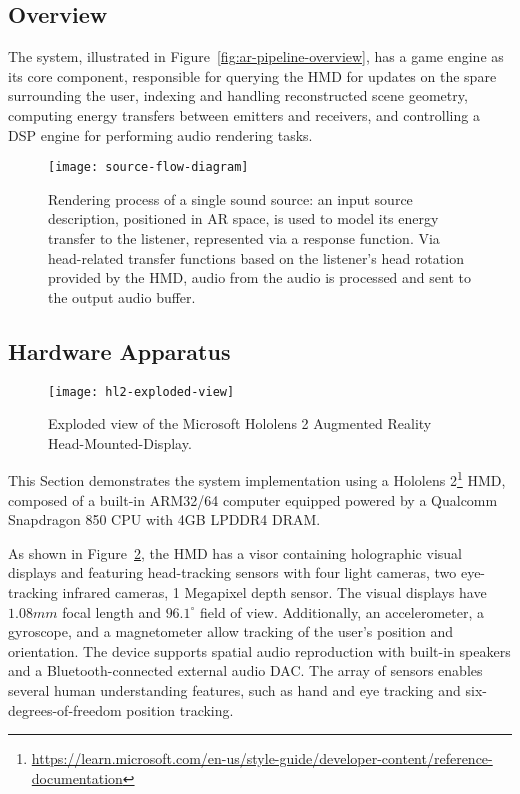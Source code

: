 \subsection{Overview}
The system, illustrated in Figure~\ref{fig:ar-pipeline-overview}, has a game engine as its core component, responsible for querying the HMD for updates on the spare surrounding the user, indexing and handling reconstructed scene geometry, computing energy transfers between emitters and receivers, and controlling a DSP engine for performing audio rendering tasks.
\begin{figure}[htb]
    \centering
    \texttt{[image: source-flow-diagram]}
    \caption{Rendering process of a single sound source: an input source description, positioned in AR space, is used to model its energy transfer to the listener, represented via a response function. Via head-related transfer functions based on the listener's head rotation provided by the HMD, audio from the audio is processed and sent to the output audio buffer.}
\label{fig:source-flow-diagram}
\end{figure}

\subsection{Hardware Apparatus}
\begin{figure}[h]
    \centering
    \texttt{[image: hl2-exploded-view]}
    \caption{Exploded view of the Microsoft Hololens 2 Augmented Reality Head-Mounted-Display.}
\label{fig:hl2-exploded-view}
\end{figure}
This Section demonstrates the system implementation using a Hololens 2\footnote{\href{learn.microsoft.com/en-us/style-guide/developer-content/reference-documentation}{https://learn.microsoft.com/en-us/style-guide/developer-content/reference-documentation}} HMD, composed of a built-in ARM32/64 computer equipped powered by a Qualcomm Snapdragon 850 CPU with 4GB LPDDR4 DRAM.\par
As shown in Figure~\ref{fig:hl2-exploded-view}, the HMD has a visor containing holographic visual displays and featuring head-tracking sensors with four light cameras, two eye-tracking infrared cameras, 1 Megapixel depth sensor. The visual displays have $1.08mm$ focal length and $96.1^\circ$ field of view. Additionally, an accelerometer, a gyroscope, and a magnetometer allow tracking of the user's position and 
orientation. The device supports spatial audio reproduction with built-in speakers and a Bluetooth-connected external audio DAC. The array of sensors enables several human understanding features, such as hand and eye tracking and six-degrees-of-freedom position tracking.

